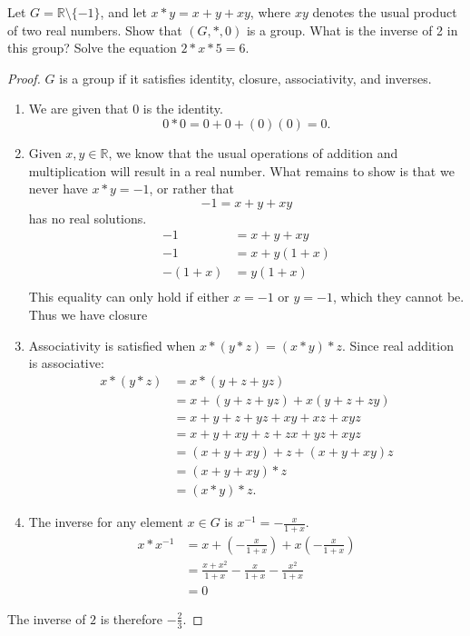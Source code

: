 \documentclass[10pt]{article}
\theoremstyle{definition}
\theoremstyle{remark}
\newcommand{\R}{\mathbb{R}}
\begin{document}
Let $G = \R \setminus \{-1\}$, and let $x * y = x + y + xy$, where $xy$ denotes
the usual product of two real numbers. Show that $(G, *, 0)$ is a group. What
is the inverse of 2 in this group? Solve the equation $2 * x * 5 = 6$.

\begin{proof}
    $G$ is a group if it satisfies identity, closure, associativity, and inverses. 
    \begin{enumerate}[label=(\roman*)]
        \item We are given that $0$ is the identity. 
            \[ 0 * 0 = 0 + 0 + (0)(0) = 0. \]
        \item Given $x, y \in \R$, we know that the usual operations of addition
            and multiplication will result in a real number. What remains to show is 
            that we never have $x * y = -1$, or rather that 
            \[ -1 = x + y + xy \] 
            has no real solutions.
            \begin{align*}
                - 1 &= x + y + xy \\
                -1 &= x + y(1 + x) \\
                -(1 + x) &= y(1 + x) \\
            \end{align*}
            This equality can only hold if either $x = -1$ or $y = -1$, which they 
            cannot be. Thus we have closure
        \item Associativity is satisfied when $x * (y * z) = (x * y) * z$. Since
            real addition is associative:
            \begin{align*}
                x * (y * z) &= x * (y + z + yz) \\
                            &= x + (y + z + yz) + x(y + z + zy) \\
                            &= x + y + z + yz + xy + xz + xyz \\
                            &= x + y + xy + z + zx + yz + xyz \\
                            &= (x + y + xy) + z + (x + y + xy)z \\
                            &= (x + y + xy) * z \\
                            &= (x * y) * z. 
            \end{align*}
        \item The inverse for any element $x \in G$ is $x^{-1} = -\frac{x}{1+x}$. 
            \begin{align*}
                x * x^{-1} &= x + (-\frac{x}{1 + x}) + x(-\frac{x}{1+x}) \\
                           &= \frac{x + x^2}{1 + x} - \frac{x}{1 + x} - \frac{x^2}{1 + x} \\
                           &= 0
            \end{align*}
    \end{enumerate}
    The inverse of $2$ is therefore $-\frac{2}{3}$.


\end{proof}
\end{document}
